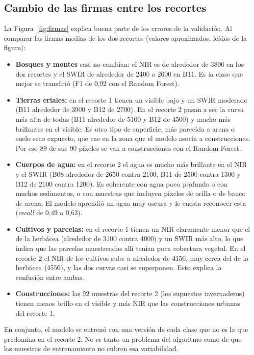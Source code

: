 \documentclass[11pt,letterpaper]{article}
\begin{document}
\subsection{Cambio de las firmas entre los recortes}
\label{sec:cambio_firmas}
La Figura~\ref{fig:firmas} explica buena parte de los errores de la validación. Al comparar las firmas
medias de los dos recortes (valores aproximados, leídos de la figura):
\begin{itemize}
    \item \textbf{Bosques y montes} casi no cambian: el NIR es de alrededor de 3800 en los dos recortes y el
    SWIR de alrededor de 2400 a 2600 en B11. Es la clase que mejor se transfirió (F1 de 0,92 con el Random
    Forest).
    \item \textbf{Tierras eriales:} en el recorte 1 tienen un visible bajo y un SWIR moderado (B11 alrededor
    de 3900 y B12 de 2700). En el recorte 2 pasan a ser la curva más alta de todas (B11 alrededor de 5100 y
    B12 de 4500) y mucho más brillantes en el visible. Es otro tipo de superficie, más parecida a arena o suelo
    seco expuesto, que cae en la zona que el modelo asocia a construcciones. Por eso 89 de sus 90 píxeles se
    van a construcciones con el Random Forest.
    \item \textbf{Cuerpos de agua:} en el recorte 2 el agua es mucho más brillante en el NIR y el SWIR
    (B08 alrededor de 2650 contra 2100, B11 de 2500 contra 1300 y B12 de 2100 contra 1200). Es coherente con
    agua poco profunda o con muchos sedimentos, o con muestras que incluyen píxeles de orilla o de banco de
    arena. El modelo aprendió un agua muy oscura y le cuesta reconocer esta (\emph{recall} de 0,49 a 0,63).
    \item \textbf{Cultivos y parcelas:} en el recorte 1 tienen un NIR claramente menor que el de la herbácea
    (alrededor de 3100 contra 4000) y un SWIR más alto, lo que indica que las parcelas muestreadas allí tenían
    poca cobertura vegetal. En el recorte 2 el NIR de los cultivos sube a alrededor de 4150, muy cerca del de
    la herbácea (4550), y las dos curvas casi se superponen. Esto explica la confusión entre ambas.
    \item \textbf{Construcciones:} las 92 muestras del recorte 2 (los supuestos invernaderos) tienen menos
    brillo en el visible y más NIR que las construcciones urbanas del recorte 1.
\end{itemize}
En conjunto, el modelo se entrenó con una versión de cada clase que no es la que predomina en el recorte 2.
No es tanto un problema del algoritmo como de que las muestras de entrenamiento no cubren esa variabilidad.
\end{document}
